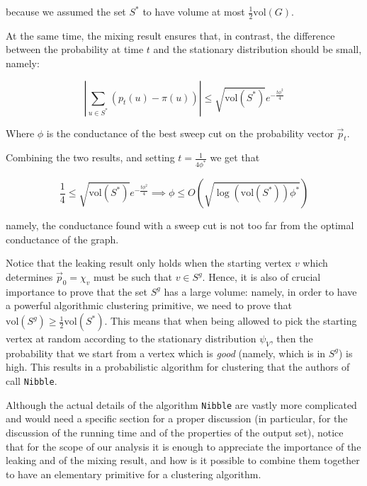 \documentclass[../main.tex]{subfiles}
\begin{document}
    because we assumed the set $S^*$ to have volume at most $\frac{1}{2}\text{vol}(G)$. 
    
    At the same time, the mixing result ensures that, in contrast, the difference between the probability at time $t$ and the stationary distribution should be small, namely:
    
    \begin{equation}
        \left|\sum_{u\in S^*} (p_t(u) - \pi(u))\right| \leq \sqrt{\text{vol}(S^*)}e^{-\frac{t\phi^2}{4}}
    \end{equation}
        
    Where $\phi$ is the conductance of the best sweep cut on the probability vector $\vec{p}_t$.
    
    Combining the two results, and setting $t=\frac{1}{4\phi^*}$ we get that
    
    \begin{equation}
        \frac{1}{4} \leq \sqrt{\text{vol}(S^*)} e^{-\frac{t\phi^2}{4}} \implies \phi \leq O(\sqrt{\log(\text{vol}(S^*)) \phi^*})
    \end{equation}
    
    namely, the conductance found with a sweep cut is not too far from the optimal conductance of the graph.
    
    Notice that the leaking result only holds when the starting vertex $v$ which determines $\vec{p}_0 = \chi_v$ must be such that $v\in S^g$. Hence, it is also of crucial importance to prove that the set $S^g$ has a large volume: namely, in order to have a powerful algorithmic clustering primitive, we need to prove that $\text{vol}(S^g) \geq \frac{1}{2}\text{vol}(S^*)$. This means that when being allowed to pick the starting vertex at random according to the stationary distribution $\psi_{V}$, then the probability that we start from a vertex which is \textit{good} (namely, which is in $S^g$) is high. This results in a probabilistic algorithm for clustering that the authors of \cite{SpielmanClustering} call \texttt{Nibble}.
    
    Although the actual details of the algorithm \texttt{Nibble} are vastly more complicated and would need a specific section for a proper discussion (in particular, for the discussion of the running time and of the properties of the output set), notice that for the scope of our analysis it is enough to appreciate the importance of the leaking and of the mixing result, and how is it possible to combine them together to have an elementary primitive for a clustering algorithm.
\end{document}
